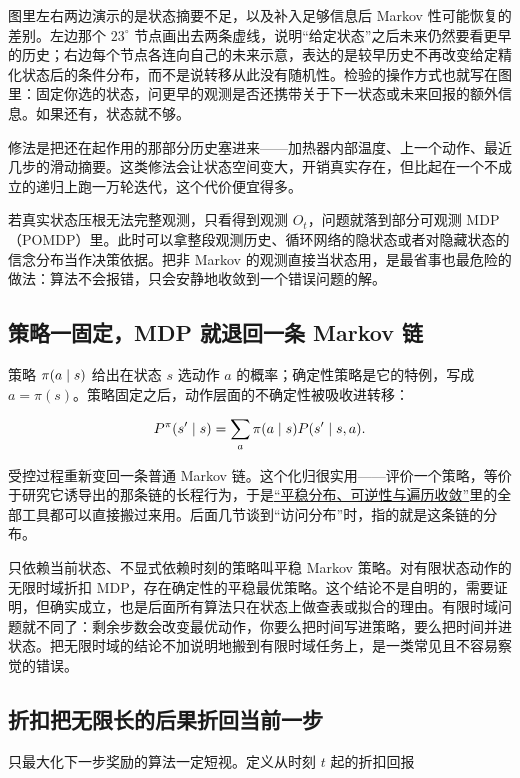 图里左右两边演示的是状态摘要不足，以及补入足够信息后 Markov 性可能恢复的差别。左边那个 \(23^\circ\) 节点画出去两条虚线，说明``给定状态''之后未来仍然要看更早的历史；右边每个节点各连向自己的未来示意，表达的是较早历史不再改变给定精化状态后的条件分布，而不是说转移从此没有随机性。检验的操作方式也就写在图里：固定你选的状态，问更早的观测是否还携带关于下一状态或未来回报的额外信息。如果还有，状态就不够。

修法是把还在起作用的那部分历史塞进来——加热器内部温度、上一个动作、最近几步的滑动摘要。这类修法会让状态空间变大，开销真实存在，但比起在一个不成立的递归上跑一万轮迭代，这个代价便宜得多。

若真实状态压根无法完整观测，只看得到观测 \(O_t\)，问题就落到部分可观测 MDP（POMDP）里。此时可以拿整段观测历史、循环网络的隐状态或者对隐藏状态的信念分布当作决策依据。把非 Markov 的观测直接当状态用，是最省事也最危险的做法：算法不会报错，只会安静地收敛到一个错误问题的解。

\subsection{策略一固定，MDP 就退回一条 Markov 链}

策略 \(\pi(a\mid s)\) 给出在状态 \(s\) 选动作 \(a\) 的概率；确定性策略是它的特例，写成 \(a=\pi(s)\)。策略固定之后，动作层面的不确定性被吸收进转移：

\[
P^\pi(s'\mid s)
=
\sum_a \pi(a\mid s)P(s'\mid s,a).
\]

受控过程重新变回一条普通 Markov 链。这个化归很实用——评价一个策略，等价于研究它诱导出的那条链的长程行为，于是\hyperref[sec:06-Random-Processes/03-Markov-Chains/04]{``平稳分布、可逆性与遍历收敛''}里的全部工具都可以直接搬过来用。后面几节谈到``访问分布''时，指的就是这条链的分布。

只依赖当前状态、不显式依赖时刻的策略叫平稳 Markov 策略。对有限状态动作的无限时域折扣 MDP，存在确定性的平稳最优策略。这个结论不是自明的，需要证明，但确实成立，也是后面所有算法只在状态上做查表或拟合的理由。有限时域问题就不同了：剩余步数会改变最优动作，你要么把时间写进策略，要么把时间并进状态。把无限时域的结论不加说明地搬到有限时域任务上，是一类常见且不容易察觉的错误。

\subsection{折扣把无限长的后果折回当前一步}

只最大化下一步奖励的算法一定短视。定义从时刻 \(t\) 起的折扣回报

